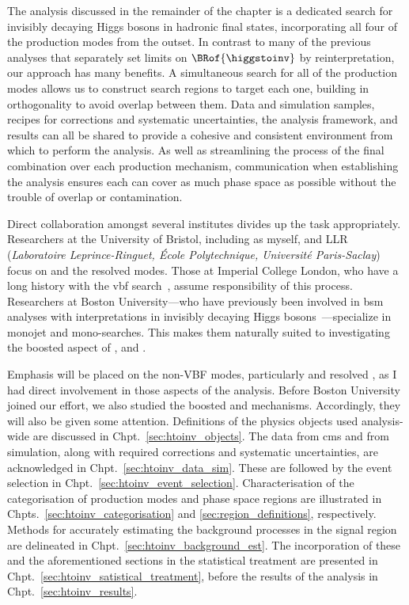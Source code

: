The analysis discussed in the remainder of the chapter is a dedicated search for invisibly decaying Higgs bosons in hadronic final states, incorporating all four of the production modes from the outset. In contrast to many of the previous analyses that separately set limits on $\BRof{\higgstoinv}$ by reinterpretation, our approach has many benefits. A simultaneous search for all of the production modes allows us to construct search regions to target each one, building in orthogonality to avoid overlap between them. Data and simulation samples, recipes for corrections and systematic uncertainties, the analysis framework, and results can all be shared to provide a cohesive and consistent environment from which to perform the analysis. As well as streamlining the process of the final combination over each production mechanism, communication when establishing the analysis ensures each can cover as much phase space as possible without the trouble of overlap or contamination.

Direct collaboration amongst several institutes divides up the task appropriately. Researchers at the University of Bristol, including as myself, and LLR (\emph{Laboratoire Leprince-Ringuet, \'{E}cole Polytechnique, Universit\'{e} Paris-Saclay}) focus on \ttH and the resolved \VH modes. Those at Imperial College London, who have a long history with the \acrshort{vbf} search~\cite{Chatrchyan:2014tja,Sirunyan:2018owy}, assume responsibility of this process. Researchers at Boston University---who have previously been involved in \acrshort{bsm} analyses with interpretations in invisibly decaying Higgs bosons~\cite{Khachatryan:2016mdm,Sirunyan:2017jix}---specialize in monojet and mono-\PVec searches. This makes them naturally suited to investigating the boosted aspect of \VH, and \ggF.

Emphasis will be placed on the non-VBF modes, particularly \ttH and resolved \VH, as I had direct involvement in those aspects of the analysis. Before Boston University joined our effort, we also studied the boosted \VH and \ggF mechanisms. Accordingly, they will also be given some attention. Definitions of the physics objects used analysis-wide are discussed in Chpt.~\ref{sec:htoinv_objects}. The data from \acrshort{cms} and from simulation, along with required corrections and systematic uncertainties, are acknowledged in Chpt.~\ref{sec:htoinv_data_sim}. These are followed by the event selection in Chpt.~\ref{sec:htoinv_event_selection}. Characterisation of the categorisation of production modes and phase space regions are illustrated in Chpts.~\ref{sec:htoinv_categorisation} and \ref{sec:region_definitions}, respectively. Methods for accurately estimating the background processes in the signal region are delineated in Chpt.~\ref{sec:htoinv_background_est}. The incorporation of these and the aforementioned sections in the statistical treatment are presented in Chpt.~\ref{sec:htoinv_satistical_treatment}, before the results of the analysis in Chpt.~\ref{sec:htoinv_results}.

